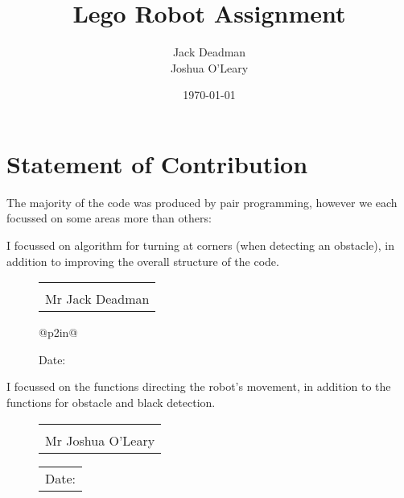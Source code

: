 \documentclass[a4paper]{report}
\makeatletter
\newcommand{\sign}[1]{%
  \begin{tabular}[t]{@{}l@{}}
  \makebox[2in]{\dotfill}\\
  \strut#1\strut
  \end{tabular}%
}
\newcommand{\Date}{%
  \begin{tabular}[t]{@{}p{2in}@{}}
  \\[-2ex]
  \strut Date: \dotfill\strut
  \end{tabular}%
}
\newcommand{\subtitle}[1]{%
  \posttitle{%
    \par\end{center}
    \begin{center}\large#1\end{center}
    \vskip0.5em}%
}
\makeatother
\begin{document}
\title{Lego Robot Assignment}
\subtitle{COM1003}
\date{\today}
\author{Jack Deadman\\ Joshua O'Leary}
	
\maketitle

\section*{Statement of Contribution}

The majority of the code was produced by pair programming, however we each focussed on some areas more than others:

\begin{minipage}{8cm}

\end{minipage}

I focussed on algorithm for turning at corners (when detecting an obstacle), in addition to improving the overall structure of the code.
\begin{figure}[h]
	\begin{minipage}[c]{0.4\linewidth}
    	\sign{Mr Jack Deadman}
    	\Date
	\end{minipage}

\end{figure}

I focussed on the functions directing the robot's movement, in addition to the functions for obstacle and black detection.
\begin{figure}[h]
	\begin{minipage}[c]{0.4\linewidth}
		\sign{Mr Joshua O'Leary}
		\Date
	\end{minipage}	
\end{figure}
\end{document}
